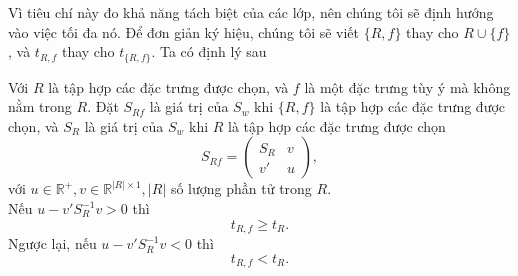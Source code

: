 Vì tiêu chí này đo khả năng tách biệt của các lớp, nên chúng tôi sẽ định hướng vào việc tối đa nó. Để đơn giản ký hiệu, chúng tôi sẽ viết $\{R,f\}$ thay cho $R\cup \{f\}$, và $t_{R, f}$ thay cho  $t_{\{R, f\}}$. Ta có định lý sau
\begin{theorem}\label{th2}
	Với $R$ là tập hợp các đặc trưng được chọn, và $f$ là một đặc trưng tùy ý mà không nằm trong $R$. Đặt $S_{Rf}$ là giá trị của $S_w$ khi $\{R, f\}$ là tập hợp các đặc trưng được chọn, và $S_R$ là giá trị của $S_w$ khi $R$ là tập hợp các đặc trưng được chọn
	\begin{equation}
		S_{Rf} = \begin{pmatrix}
			S_R & v\\
			v'& u
		\end{pmatrix},
	\end{equation}
	với $ u \in \mathbb{R}^{+}, v \in \mathbb{R}^{|R| \times 1}, |R| $ số lượng phần tử trong $R$.\\
	Nếu $u - v'S_R^{-1}v>0$ thì
	\begin{equation}
		t_{R,f}\ge t_R.
	\end{equation}
	Ngược lại, nếu $u - v'S_R^{-1}v<0$ thì
	\begin{equation}\label{eq7}
		t_{R,f}< t_R.
	\end{equation}
\end{theorem}
